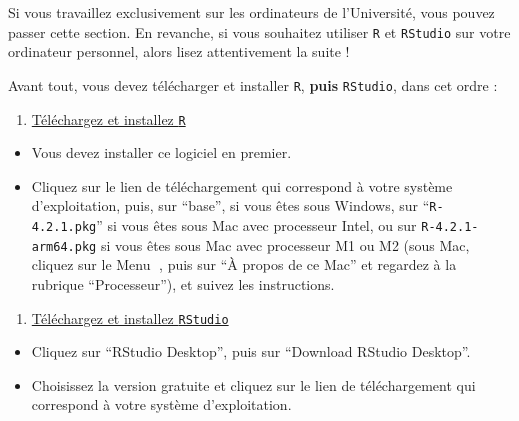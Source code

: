 \documentclass[
  a4paper,
  DIV=11,
  numbers=noendperiod,
  oneside]{scrreprt}
\providecommand{\tightlist}{%
  \setlength{\itemsep}{0pt}\setlength{\parskip}{0pt}}\usepackage{longtable,booktabs,array}
\begin{document}
\begin{tcolorbox}[enhanced jigsaw, arc=.35mm, opacityback=0, colbacktitle=quarto-callout-warning-color!10!white, bottomrule=.15mm, coltitle=black, colframe=quarto-callout-warning-color-frame, breakable, toprule=.15mm, title=\textcolor{quarto-callout-warning-color}{\faExclamationTriangle}\hspace{0.5em}{Avertissement}, leftrule=.75mm, titlerule=0mm, bottomtitle=1mm, toptitle=1mm, left=2mm, rightrule=.15mm, opacitybacktitle=0.6, colback=white]

Si vous travaillez exclusivement sur les ordinateurs de l'Université,
vous pouvez passer cette section. En revanche, si vous souhaitez
utiliser \texttt{R} et \texttt{RStudio} sur votre ordinateur personnel,
alors lisez attentivement la suite !

\end{tcolorbox}

Avant tout, vous devez télécharger et installer \texttt{R},
\textbf{puis} \texttt{RStudio}, dans cet ordre :

\begin{enumerate}
\def\labelenumi{\arabic{enumi}.}
\tightlist
\item
  \href{https://cran.r-project.org}{Téléchargez et installez \texttt{R}}
\end{enumerate}

\begin{itemize}
\tightlist
\item
  Vous devez installer ce logiciel en premier.
\item
  Cliquez sur le lien de téléchargement qui correspond à votre système
  d'exploitation, puis, sur ``base'', si vous êtes sous Windows, sur
  ``\texttt{R-4.2.1.pkg}'' si vous êtes sous Mac avec processeur Intel,
  ou sur \texttt{R-4.2.1-arm64.pkg} si vous êtes sous Mac avec
  processeur M1 ou M2 (sous Mac, cliquez sur le Menu , puis sur ``À
  propos de ce Mac'' et regardez à la rubrique ``Processeur''), et
  suivez les instructions.
\end{itemize}

\begin{enumerate}
\def\labelenumi{\arabic{enumi}.}
\setcounter{enumi}{1}
\tightlist
\item
  \href{https://www.rstudio.com/products/RStudio/\#Desktop}{Téléchargez
  et installez \texttt{RStudio}}
\end{enumerate}

\begin{itemize}
\tightlist
\item
  Cliquez sur ``RStudio Desktop'', puis sur ``Download RStudio
  Desktop''.
\item
  Choisissez la version gratuite et cliquez sur le lien de
  téléchargement qui correspond à votre système d'exploitation.
\end{itemize}
\end{document}
